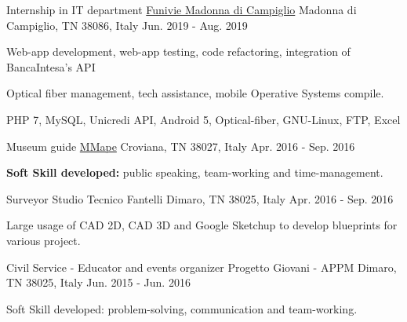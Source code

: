 

\begin{cventries}

  \cventry
    {Internship in IT department} %
    {\href{https://www.funiviecampiglio.it}{Funivie Madonna di Campiglio}} %
    {Madonna di Campiglio, TN 38086, Italy} %
    {Jun. 2019 - Aug. 2019} %
    {
      \begin{cvitems} %
        \item {Web-app development, web-app testing, code refactoring, integration of BancaIntesa's API}
        \item {Optical fiber management, tech assistance, mobile Operative Systems compile.}
        \item {PHP 7, MySQL, Unicredi API, Android 5, Optical-fiber, GNU-Linux, FTP, Excel}
      \end{cvitems}
      }
    

  \cventry
    {Museum guide} %
    {\href{https://www.mmape.it}{MMape}} %
    {Croviana, TN 38027, Italy} %
    {Apr. 2016 - Sep. 2016} %
    {
      \begin{cvitems} %
        \item {\textbf{Soft Skill developed:} public speaking, team-working and time-management.}
      \end{cvitems}
    }

  \cventry
    {Surveyor} %
    {Studio Tecnico Fantelli} %
    {Dimaro, TN 38025, Italy} %
    {Apr. 2016 - Sep. 2016} %
    {
      \begin{cvitems} %
        \item {Large usage of CAD 2D, CAD 3D and Google Sketchup to develop blueprints for various project.}
      \end{cvitems}
    }

  \cventry
    {Civil Service - Educator and events organizer} %
    {Progetto Giovani - APPM} %
    {Dimaro, TN 38025, Italy} %
    {Jun. 2015 - Jun. 2016} %
    {
      \begin{cvitems} %
        \item {Soft Skill developed: problem-solving, communication and team-working.}
      \end{cvitems}
    }

\end{cventries}
